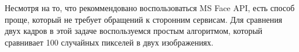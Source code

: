 \solutionSection

Несмотря на то, что рекоммендовано воспользоваться MS Face API, есть способ проще, который не требует обращений к сторонним сервисам.
Для сравнения двух кадров в этой задаче воспользуемся простым алгоритмом, который сравнивает 100 случайных пикселей в двух изображениях.

\codeExample

